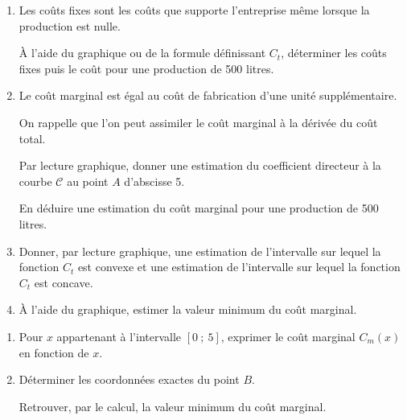 \begin{center}
\end{center}
\par
%
%
\par
\begin{enumerate}
     \item
     Les coûts fixes sont les coûts que supporte l'entreprise même lorsque la production est nulle.
     \par
     \`A l'aide du graphique ou de la formule définissant $C_t$, déterminer les coûts fixes puis le coût pour une production de 500 litres.
     \item
     Le coût marginal est égal au coût de fabrication d'une unité supplémentaire.
     \par
     On rappelle que l'on peut assimiler le coût marginal à la dérivée du coût total.
     \par
     Par lecture graphique, donner une estimation du coefficient directeur à la courbe $\mathscr{C}$ au point $A$ d'abscisse 5.
     \par
     En déduire une estimation du coût marginal pour une production de 500 litres.
     \item
     Donner, par lecture graphique, une estimation de l'intervalle sur lequel la fonction $C_t$ est convexe et une estimation de l'intervalle sur lequel la fonction $C_t$ est concave.
     \item
     \`A l'aide du graphique, estimer la valeur minimum du coût marginal.
     \par
\end{enumerate}
\par
%
%
\par
\begin{enumerate}
     \item
     Pour $x$ appartenant à l'intervalle $[0~;~5]$, exprimer le coût marginal $C_m(x)$ en fonction de $x$.
     \item
     Déterminer les coordonnées exactes du point $B$.
     \par
     Retrouver, par le calcul, la valeur minimum du coût marginal.
     \par
\end{enumerate}
